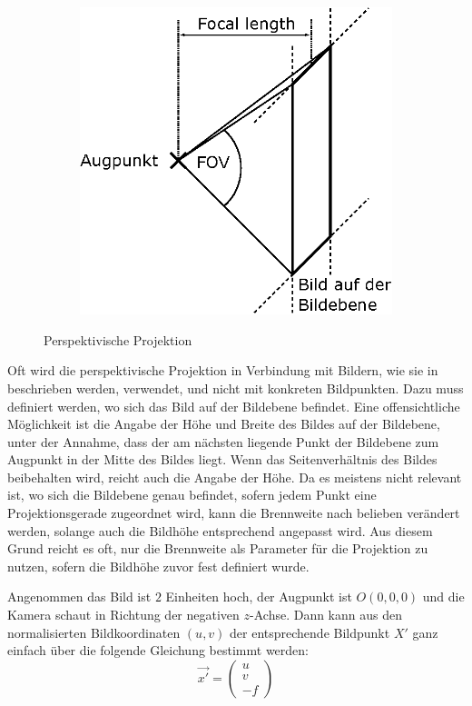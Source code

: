 \documentclass[ngerman,a4paper,parskip=half]{scrartcl}
\begin{document}
\begin{figure}
\begin{subfigure}{0.4\textwidth}
		\includegraphics[width=\textwidth]{includes/perspective2}
	\end{subfigure}
	\caption{Perspektivische Projektion}
	\label{fig:perspective}
\end{figure}

Oft wird die perspektivische Projektion in Verbindung mit Bildern, wie sie in  beschrieben werden, verwendet, und nicht mit konkreten Bildpunkten. Dazu muss definiert werden, wo sich das Bild auf der Bildebene befindet. Eine offensichtliche Möglichkeit ist die Angabe der Höhe und Breite des Bildes auf der Bildebene, unter der Annahme, dass der am nächsten liegende Punkt der Bildebene zum Augpunkt in der Mitte des Bildes liegt. Wenn das Seitenverhältnis des Bildes beibehalten wird, reicht auch die Angabe der Höhe. Da es meistens nicht relevant ist, wo sich die Bildebene genau befindet, sofern jedem Punkt eine Projektionsgerade zugeordnet wird, kann die Brennweite nach belieben verändert werden, solange auch die Bildhöhe entsprechend angepasst wird. Aus diesem Grund reicht es oft, nur die Brennweite als Parameter für die Projektion zu nutzen, sofern die Bildhöhe zuvor fest definiert wurde.

Angenommen das Bild ist $2$ Einheiten hoch, der Augpunkt ist $O(0,0,0)$ und die Kamera schaut in Richtung der negativen $z$-Achse. Dann kann aus den normalisierten Bildkoordinaten $(u,v)$ der entsprechende Bildpunkt $X'$ ganz einfach über die folgende Gleichung bestimmt werden:
\[ \vec{x'} = \begin{pmatrix}
u \\ v \\ -f
\end{pmatrix} \]
\end{document}
